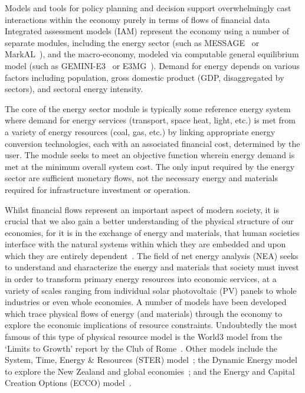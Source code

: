 \documentclass[11pt,a4paper]{article}
\begin{document}
Models and tools for policy planning and decision support
overwhelmingly cast interactions within the economy
purely in terms of flows of financial data%
Integrated assessment models (IAM)
represent the economy using a number of separate modules, 
including the energy sector 
(such as MESSAGE~\cite{Messner2000} or MarkAL~\cite{Seebregts2002}), 
and the macro-economy,
modeled via computable general equilibrium model
(such as GEMINI-E3~\cite{Bernard2008} or E3MG~\cite{Kohler2006}). 
Demand for energy depends on various factors including 
population, 
gross domestic product (GDP, disaggregated by sectors), 
and sectoral energy intensity. 

The core of the energy sector module is typically 
some reference energy system where demand for 
energy services (transport, space heat, light, etc.) 
is met from a variety of energy resources (coal, gas, etc.) 
by linking appropriate energy conversion technologies, 
each with an associated financial cost, 
determined by the user. 
The module seeks to meet an objective function 
wherein energy demand is met at the minimum overall system cost. 
The only input required by the energy sector 
are sufficient monetary flows, 
not the necessary energy and materials required for 
infrastructure investment or operation.

Whilst financial flows represent an important aspect of modern society,
it is crucial that we also gain a better understanding of 
the physical structure of our economies,
for it is in the exchange of energy and materials,
that human societies interface with the natural systems
within which they are embedded and upon which 
they are entirely dependent~\cite{Heun2015, Dale2012a}.
The field of net energy analysis (NEA)
seeks to understand and characterize the 
energy and materials that society must invest
in order to transform primary energy resources into economic services,
at a variety of scales ranging from individual solar photovoltaic (PV) panels 
to whole industries or even whole economies.
A number of models have been developed 
which trace physical flows of energy (and materials) 
through the economy to explore 
the economic implications of resource constraints. 
Undoubtedly the most famous of this type of 
physical resource model is the World3 model from 
the `Limits to Growth' report by the Club of Rome~\cite{Meadows1972}. 
Other models include the System, Time, Energy \& Resources (STER) model~\cite{Hounam1979}; 
the Dynamic Energy model to explore the New Zealand  and global  economies~\cite{Baines1983, Bodger1989}; 
and the Energy and Capital Creation Options (ECCO) model~\cite{Slesser1992}.
\end{document}
